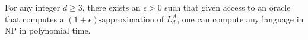 \begin{corollary}
For any integer $d\ge3$, there exists an $\epsilon>0$ such that given access to an oracle that computes a $(1+\epsilon)$-approximation of $L_d^A$, one can compute any language in $\mathrm{NP}$ in polynomial time.
\end{corollary}
